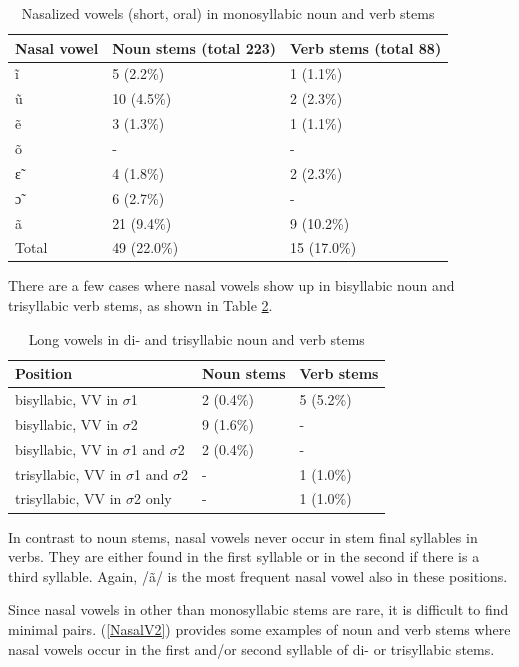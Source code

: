 \begin{table} 
\centering
\begin{tabular}{l|ll}
Nasal vowel & 	Noun stems (total 223) & Verb stems (total 88) \\  \midrule
ĩ		 & 	5 (2.2\%)	& 	1 (1.1\%) \\
ũ      	& 	10 (4.5\%)	& 	2 (2.3\%) \\
ẽ		& 	3  (1.3\%)    & 	1 (1.1\%) \\
õ	        & 	 -	& 	-  \\ 
ɛ̃             &      4 (1.8\%)   &      2 (2.3\%) \\
ɔ̃            &      6 (2.7\%)  &        - \\
ã            &      21  (9.4\%)   &     9 (10.2\%)  \\  \midrule
Total       &     49  (22.0\%)    &    15 (17.0\%)  \\
\end{tabular}
\caption{Nasalized vowels (short, oral) in monosyllabic noun and verb stems}
\label{Tab:VNasal}
\end{table}

There are a few cases where nasal vowels show up in bisyllabic noun and trisyllabic verb stems, as shown in Table \ref{Tab:VNasal2}.

\begin{table} 
\centering
\begin{tabular}{l|ll}
Position & 	Noun stems & Verb stems \\  \midrule
bisyllabic, VV in $\sigma$1 & 2 (0.4\%) & 5 (5.2\%) \\
bisyllabic, VV in $\sigma$2 & 9 (1.6\%) & - \\
bisyllabic, VV in $\sigma$1 and $\sigma$2 & 2 (0.4\%) & - \\
trisyllabic, VV in $\sigma$1 and $\sigma$2 & - & 1 (1.0\%) \\
trisyllabic, VV in $\sigma$2 only & - & 1 (1.0\%) \\
\end{tabular}
\caption{Long vowels in di- and trisyllabic noun and verb stems}
\label{Tab:VNasal2}
\end{table}

\noindent In contrast to noun stems, nasal vowels never occur in stem final syllables in verbs. They are either found in the first syllable or in the second if there is a third syllable. Again, /ã/ is the most frequent nasal vowel also in these positions.

Since nasal vowels in other than monosyllabic stems are rare, it is difficult to find minimal pairs. (\ref{NasalV2}) provides some examples of noun and verb stems where nasal vowels occur in the first and/or second syllable of di- or trisyllabic stems.

